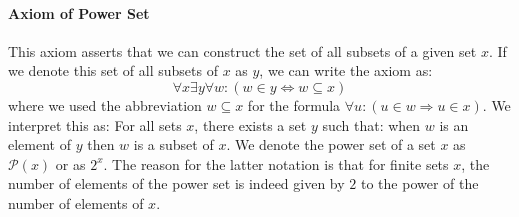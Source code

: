 


% 

\paragraph{Axiom of Power Set}
This axiom asserts that we can construct the set of all subsets of a given set $x$. If we denote this set of all subsets of $x$ as $y$, we can write the axiom as:
\begin{equation}
\forall x \exists y \forall w: (w \in y \Leftrightarrow w \subseteq x)
\end{equation}
where we used the abbreviation $w \subseteq x$ for the formula $\forall u: (u \in w \Rightarrow u \in x)$. We interpret this as: For all sets $x$, there exists a set $y$ such that: when $w$ is an element of $y$ then $w$ is a subset of $x$. We denote the power set of a set $x$ as $\mathcal{P}(x)$ or as $2^x$. The reason for the latter notation is that for finite sets $x$, the number of elements of the power set is indeed given by $2$ to the power of the number of elements of $x$.



